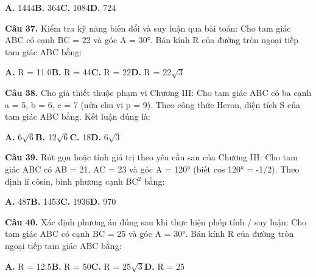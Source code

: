 \documentclass[11pt,a4paper]{article}
\begin{document}
\hspace*{1.5em}\textbf{A.} 1444\quad\quad \textbf{B.} 364\quad\quad \textbf{C.} 1084\quad\quad \textbf{D.} 724\par\vspace{2pt}
\textbf{\color{primary} Câu 37.} Kiểm tra kỹ năng biến đổi và suy luận qua bài toán: Cho tam giác ABC có cạnh BC = 22 và góc A = 30°. Bán kính R của đường tròn ngoại tiếp tam giác ABC bằng:\par
\hspace*{1.5em}\textbf{A.} R = 11.0\quad\quad \textbf{B.} R = 44\quad\quad \textbf{C.} R = 22\quad\quad \textbf{D.} R = 22$\sqrt{3}$\par\vspace{2pt}
\textbf{\color{primary} Câu 38.} Cho giả thiết thuộc phạm vi Chương III: Cho tam giác ABC có ba cạnh a = 5, b = 6, c = 7 (nửa chu vi p = 9). Theo công thức Heron, diện tích S của tam giác ABC bằng. Kết luận đúng là:\par
\hspace*{1.5em}\textbf{A.} 6$\sqrt{6}$\quad\quad \textbf{B.} 12$\sqrt{6}$\quad\quad \textbf{C.} 18\quad\quad \textbf{D.} 6$\sqrt{3}$\par\vspace{2pt}
\textbf{\color{primary} Câu 39.} Rút gọn hoặc tính giá trị theo yêu cầu sau của Chương III: Cho tam giác ABC có AB = 21, AC = 23 và góc A = 120° (biết cos 120° = -1/2). Theo định lí côsin, bình phương cạnh BC$^2$ bằng:\par
\hspace*{1.5em}\textbf{A.} 487\quad\quad \textbf{B.} 1453\quad\quad \textbf{C.} 1936\quad\quad \textbf{D.} 970\par\vspace{2pt}
\textbf{\color{primary} Câu 40.} Xác định phương án đúng sau khi thực hiện phép tính / suy luận: Cho tam giác ABC có cạnh BC = 25 và góc A = 30°. Bán kính R của đường tròn ngoại tiếp tam giác ABC bằng:\par
\hspace*{1.5em}\textbf{A.} R = 12.5\quad\quad \textbf{B.} R = 50\quad\quad \textbf{C.} R = 25$\sqrt{3}$\quad\quad \textbf{D.} R = 25\par\vspace{2pt}
\end{document}

